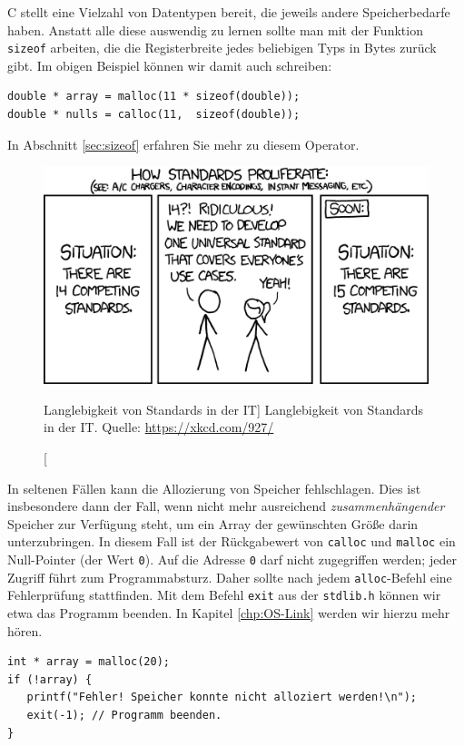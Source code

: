 \begin{hintbox}
C stellt eine Vielzahl von Datentypen bereit, die jeweils andere Speicherbedarfe haben. Anstatt alle diese auswendig zu lernen sollte man mit der Funktion \texttt{sizeof} arbeiten, die die Registerbreite jedes beliebigen Typs in Bytes zurück gibt. Im obigen Beispiel können wir damit auch schreiben:
\begin{codebox}
\begin{verbatim}
double * array = malloc(11 * sizeof(double));
double * nulls = calloc(11,  sizeof(double));
\end{verbatim}
\end{codebox}
In Abschnitt \ref{sec:sizeof} erfahren Sie mehr zu diesem Operator.
\end{hintbox}

\begin{figure}
\begin{center}
\includegraphics[width=.8\linewidth]{./gfx/xkcd-standards}
\caption
[Langlebigkeit von Standards in der IT]
{Langlebigkeit von Standards in der IT. Quelle: \url{https://xkcd.com/927/}} \label{fig:xkcd-standards}
\end{center}
\end{figure}

\begin{warnbox}
In seltenen Fällen kann die Allozierung von Speicher fehlschlagen. Dies ist insbesondere dann der Fall, wenn nicht mehr ausreichend \emph{zusammenhängender} Speicher zur Verfügung steht, um ein Array der gewünschten Größe darin unterzubringen. In diesem Fall ist der Rückgabewert von \texttt{calloc} und \texttt{malloc} ein Null-Pointer (\ie der Wert \texttt{0}). Auf die Adresse \texttt{0} darf nicht zugegriffen werden; jeder Zugriff führt zum Programmabsturz. Daher sollte nach jedem \texttt{alloc}-Befehl eine Fehlerprüfung stattfinden. Mit dem Befehl \texttt{exit} aus der \texttt{stdlib.h} können wir etwa das Programm beenden. In Kapitel \ref{chp:OS-Link} werden wir hierzu mehr hören.

\begin{codebox}
\begin{verbatim}
int * array = malloc(20);
if (!array) {
   printf("Fehler! Speicher konnte nicht alloziert werden!\n");
   exit(-1); // Programm beenden.
}
\end{verbatim}
\end{codebox}
\end{warnbox}

